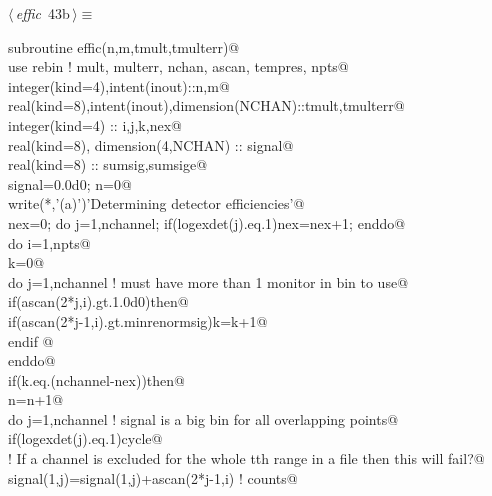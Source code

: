 \documentclass[10pt,a4paper,notitlepage]{article}
\begin{document}
\begin{flushleft} \small\label{scrap47}\raggedright\small
{} $\langle\,${\it effic}\nobreak\ {\footnotesize {43b}}$\,\rangle\equiv$
\vspace{-1ex}
\begin{list}{}{} \item
\mbox{}\verb@      subroutine effic(n,m,tmult,tmulterr)@\\
\mbox{}\verb@      use rebin ! mult, multerr, nchan, ascan, tempres, npts@\\
\mbox{}\verb@      integer(kind=4),intent(inout)::n,m@\\
\mbox{}\verb@      real(kind=8),intent(inout),dimension(NCHAN)::tmult,tmulterr@\\
\mbox{}\verb@      integer(kind=4) :: i,j,k,nex@\\
\mbox{}\verb@      real(kind=8), dimension(4,NCHAN) :: signal@\\
\mbox{}\verb@      real(kind=8) :: sumsig,sumsige@\\
\mbox{}\verb@      signal=0.0d0; n=0@\\
\mbox{}\verb@      write(*,'(a)')'Determining detector efficiencies'@\\
\mbox{}\verb@      nex=0; do j=1,nchannel; if(logexdet(j).eq.1)nex=nex+1; enddo@\\
\mbox{}\verb@      do i=1,npts@\\
\mbox{}\verb@        k=0@\\
\mbox{}\verb@        do j=1,nchannel         ! must have more than 1 monitor in bin to use@\\
\mbox{}\verb@          if(ascan(2*j,i).gt.1.0d0)then@\\
\mbox{}\verb@             if(ascan(2*j-1,i).gt.minrenormsig)k=k+1@\\
\mbox{}\verb@          endif @\\
\mbox{}\verb@        enddo@\\
\mbox{}\verb@        if(k.eq.(nchannel-nex))then@\\
\mbox{}\verb@          n=n+1@\\
\mbox{}\verb@          do j=1,nchannel    ! signal is a big bin for all overlapping points@\\
\mbox{}\verb@            if(logexdet(j).eq.1)cycle@\\
\mbox{}\verb@! If a channel is excluded for the whole tth range in a file then this will fail?@\\
\mbox{}\verb@            signal(1,j)=signal(1,j)+ascan(2*j-1,i) ! counts@\\

\end{list}
\end{flushleft}
\end{document}
